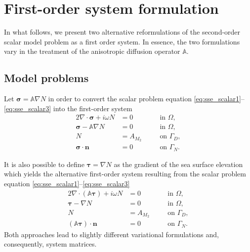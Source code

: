 \documentclass[11pt,a4paper]{article}
\begin{document}
\section{First-order system formulation}

In what follows, we present two alternative reformulations of the second-order scalar model problem as a first order system. In essence, the two formulations vary in the treatment of the anisotropic diffusion operator $\mathbb{A}$.

\subsection{Model problems}
Let $\boldsymbol{\sigma}=\mathbb{A}\nabla N$ in order to convert the scalar problem equation \eqref{eq:sse_scalar1}--\eqref{eq:sse_scalar3} into the first-order system
\begin{alignat}{2}
\nabla\cdot\boldsymbol{\sigma}+i\omega N&=0  \quad && \text{in } \Omega,
\label{eq:sse_system1}\\
\boldsymbol{\sigma}-\mathbb{A}\nabla N&=0 \quad && \text{in } \Omega,
\label{eq:sse_system2}\\
N&=A_{M_2} \quad && \text{on } \Gamma_D,
\label{eq:sse_system3}\\
\boldsymbol{\sigma}\cdot\mathbf{n}&=0 \quad && \text{on } \Gamma_N.
\label{eq:sse_system4}
\end{alignat}

It is also possible to define $\boldsymbol{\tau}=\nabla N$ as the gradient of the sea surface elevation which yields the alternative first-order system resulting from the scalar problem equation \eqref{eq:sse_scalar1}--\eqref{eq:sse_scalar3}
\begin{alignat}{2}
\nabla\cdot(\mathbb{A}\boldsymbol{\tau})+i\omega N&=0  \quad && \text{in } \Omega,
\label{eq:sse_system5}\\
\boldsymbol{\tau}-\nabla N&=0 \quad && \text{in } \Omega,
\label{eq:sse_system6}\\
N&=A_{M_2} \quad && \text{on } \Gamma_D,
\label{eq:sse_system7}\\
(\mathbb{A}\boldsymbol{\tau})\cdot\mathbf{n}&=0 \quad && \text{on } \Gamma_N.
\label{eq:sse_system8}
\end{alignat}
Both approaches lead to slightly different variational formulations and, consequently, system matrices.
\end{document}
